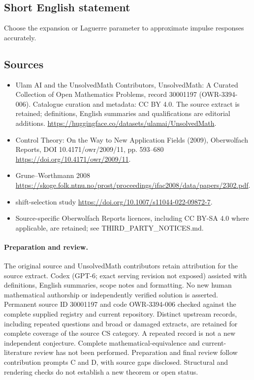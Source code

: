 \documentclass[11pt]{article}
\begin{document}
\subsection{Short English statement}
Choose the expansion or Laguerre parameter to approximate impulse responses accurately.
\subsection{Sources}
\begin{itemize}
\item[\hypertarget{source:30001197:1}{S1}] Ulam AI and the UnsolvedMath Contributors, UnsolvedMath: A Curated Collection of Open Mathematics Problems, record 30001197 (OWR-3394-006). Catalogue curation and metadata: CC BY 4.0. The source extract is retained; definitions, English summaries and qualifications are editorial additions.
\url{https://huggingface.co/datasets/ulamai/UnsolvedMath}.
\item[\hypertarget{source:30001197:2}{S2}] Control Theory: On the Way to New Application Fields (2009), Oberwolfach Reports, DOI 10.4171/owr/2009/11, pp. 593--680
\url{https://doi.org/10.4171/owr/2009/11}.
\item[\hypertarget{source:30001197:3}{S3}] Grune--Worthmann 2008
\url{https://skoge.folk.ntnu.no/prost/proceedings/ifac2008/data/papers/2302.pdf}.
\item[\hypertarget{source:30001197:4}{S4}] shift-selection study
\url{https://doi.org/10.1007/s11044-022-09872-7}.
\item Source-specific Oberwolfach Reports licences, including CC BY-SA 4.0 where applicable, are retained; see THIRD\_PARTY\_NOTICES.md.
\end{itemize}
\paragraph{Preparation and review.}
The original source and UnsolvedMath contributors retain attribution for the source extract. Codex (GPT-6; exact serving revision not exposed) assisted with definitions, English summaries, scope notes and formatting. No new human mathematical authorship or independently verified solution is asserted. Permanent source ID 30001197 and code OWR-3394-006 checked against the complete supplied registry and current repository. Distinct upstream records, including repeated questions and broad or damaged extracts, are retained for complete coverage of the source CS category. A repeated record is not a new independent conjecture. Complete mathematical-equivalence and current-literature review has not been performed. Preparation and final review follow contribution prompts C and D, with source gaps disclosed. Structural and rendering checks do not establish a new theorem or open status.
\label{end:30001197}
\end{document}

